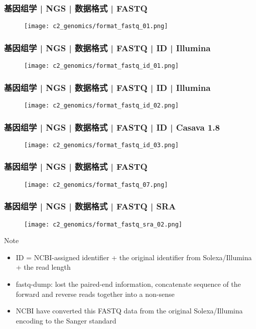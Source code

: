 \begin{frame}
  \frametitle{基因组学 | NGS | 数据格式 | FASTQ}
  \begin{figure}
    \centering
    \texttt{[image: c2\_genomics/format\_fastq\_01.png]}
  \end{figure}
\end{frame}
    
\begin{frame}
  \frametitle{基因组学 | NGS | 数据格式 | FASTQ | ID | Illumina}
  \begin{figure}
    \centering
    \texttt{[image: c2\_genomics/format\_fastq\_id\_01.png]}
  \end{figure}
\end{frame}
    
\begin{frame}
  \frametitle{基因组学 | NGS | 数据格式 | FASTQ | ID | Illumina}
  \begin{figure}
    \centering
    \texttt{[image: c2\_genomics/format\_fastq\_id\_02.png]}
  \end{figure}
\end{frame}
    
\begin{frame}
  \frametitle{基因组学 | NGS | 数据格式 | FASTQ | ID | Casava 1.8}
  \begin{figure}
    \centering
    \texttt{[image: c2\_genomics/format\_fastq\_id\_03.png]}
  \end{figure}
\end{frame}

\begin{frame}
  \frametitle{基因组学 | NGS | 数据格式 | FASTQ}
  \begin{figure}
    \centering
    \texttt{[image: c2\_genomics/format\_fastq\_07.png]}
  \end{figure}
\end{frame}
    
\begin{frame}
  \frametitle{基因组学 | NGS | 数据格式 | FASTQ | SRA}
  \begin{figure}
    \centering
    \texttt{[image: c2\_genomics/format\_fastq\_sra\_02.png]}
  \end{figure}
  \begin{block}{Note}
    \begin{itemize}
      \item ID = NCBI-assigned identifier + the original identifier from Solexa/Illumina + the read length
      \item fastq-dump: lost the paired-end information, concatenate sequence of the forward and reverse reads together into a non-sense
      \item NCBI have converted this FASTQ data from the original Solexa/Illumina encoding to the Sanger standard
    \end{itemize}
  \end{block}
\end{frame}

